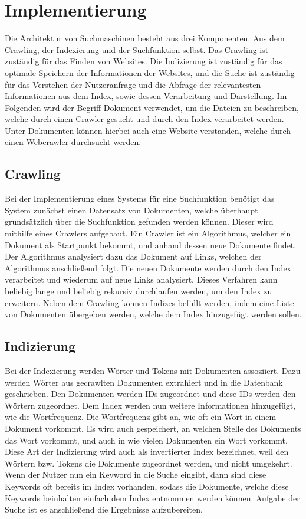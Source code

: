 \chapter{Implementierung}

Die Architektur von Suchmaschinen besteht aus drei Komponenten. Aus dem Crawling, der Indexierung und der Suchfunktion selbst. Das Crawling ist zuständig für das Finden von Websites. Die Indizierung ist zuständig für das optimale Speichern der Informationen der Websites, und die Suche ist zuständig für das Verstehen der Nutzeranfrage und die Abfrage der relevantesten Informationen aus dem Index, sowie dessen Verarbeitung und Darstellung.
Im Folgenden wird der Begriff Dokument verwendet, um die Dateien zu beschreiben, welche durch einen Crawler gesucht und durch den Index verarbeitet werden. Unter Dokumenten können hierbei auch eine Website verstanden, welche durch einen Webcrawler durchsucht werden.

\section{Crawling}
Bei der Implementierung eines Systems für eine Suchfunktion benötigt das System zunächst einen Datensatz von Dokumenten, welche überhaupt grundsätzlich über die Suchfunktion gefunden werden können. Dieser wird mithilfe eines Crawlers aufgebaut. Ein Crawler ist ein Algorithmus, welcher ein Dokument als Startpunkt bekommt, und anhand dessen neue Dokumente findet. Der Algorithmus analysiert dazu das Dokument auf Links, welchen der Algorithmus anschließend folgt. Die neuen Dokumente werden durch den Index verarbeitet und wiederum auf neue Links analysiert. Dieses Verfahren kann beliebig lange und beliebig rekursiv durchlaufen werden, um den Index zu erweitern.
Neben dem Crawling können Indizes befüllt werden, indem eine Liste von Dokumenten übergeben werden, welche dem Index hinzugefügt werden sollen.

\section{Indizierung}
Bei der Indexierung werden Wörter und Tokens mit Dokumenten assoziiert. Dazu werden Wörter aus gecrawlten Dokumenten extrahiert und in die Datenbank geschrieben. Den Dokumenten werden IDs zugeordnet und diese IDs werden den Wörtern zugeordnet. Dem Index werden nun weitere Informationen hinzugefügt, wie die Wortfrequenz. Die Wortfrequenz gibt an, wie oft ein Wort in einem Dokument vorkommt. Es wird auch gespeichert, an welchen Stelle des Dokuments das Wort vorkommt, und auch in wie vielen Dokumenten ein Wort vorkommt. Diese Art der Indizierung wird auch als invertierter Index bezeichnet, weil den Wörtern bzw. Tokens die Dokumente zugeordnet werden, und nicht umgekehrt.
Wenn der Nutzer nun ein Keyword in die Suche eingibt, dann sind diese Keywords oft bereits im Index vorhanden, sodass die Dokumente, welche diese Keywords beinhalten einfach dem Index entnommen werden können. Aufgabe der Suche ist es anschließend die Ergebnisse aufzubereiten.

